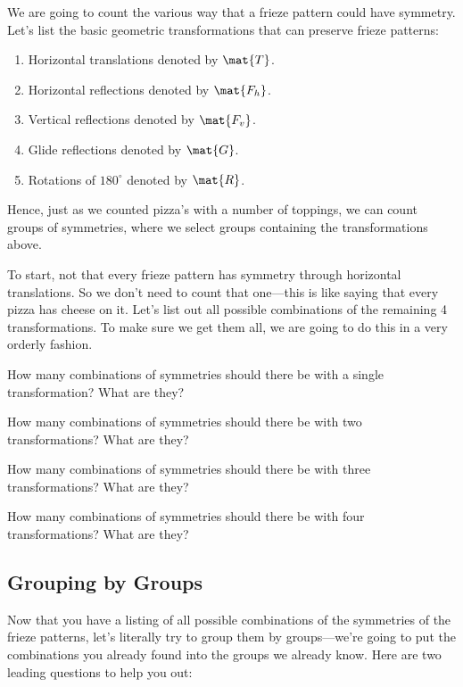 We are going to count the various way that a frieze pattern could have
symmetry. Let's list the basic geometric transformations that can
preserve frieze patterns:
\begin{enumerate}
\item Horizontal translations denoted by $\mat{T}$.
\item Horizontal reflections denoted by $\mat{F_h}$.
\item Vertical reflections denoted by $\mat{F_v}$.
\item Glide reflections denoted by $\mat{G}$.
\item Rotations of $180^\circ$ denoted by $\mat{R}$.
\end{enumerate}
Hence, just as we counted pizza's with a number of toppings, we can
count groups of symmetries, where we select groups containing the
transformations above.

To start, not that every frieze pattern has symmetry through horizontal
translations. So we don't need to count that one---this is like saying
that every pizza has cheese on it. Let's list out all possible combinations
of the remaining 4 transformations. To make sure we get them all, we are
going to do this in a very orderly fashion.

\begin{ques} 
How many combinations of symmetries should there be with a single
transformation?  What are they?
\end{ques}
\QM

\begin{ques} 
How many combinations of symmetries should there be with two
transformations?  What are they?
\end{ques}
\QM

\begin{ques} 
How many combinations of symmetries should there be with three
transformations?  What are they?
\end{ques}
\QM

\begin{ques} 
How many combinations of symmetries should there be with four
transformations?  What are they?
\end{ques}
\QM



\subsection{Grouping by Groups}

Now that you have a listing of all possible combinations of the
symmetries of the frieze patterns, let's literally try to group them
by groups---we're going to put the combinations you already found into
the groups we already know. Here are two leading questions to help you
out:


